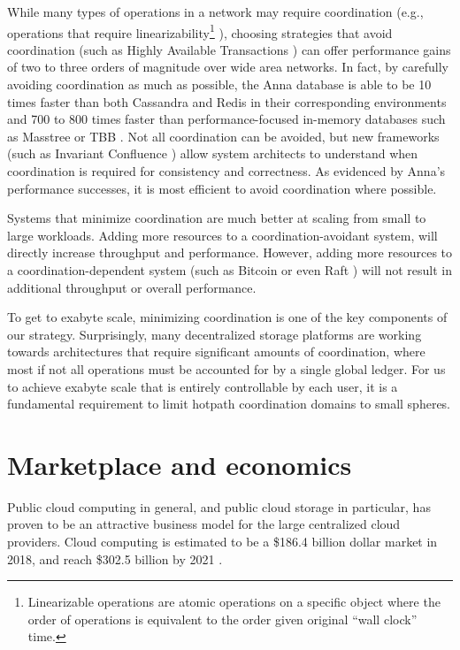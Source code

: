 \documentclass[11pt,fleqn,openany]{book}
\begin{document}
While many types of operations in a network may require coordination
(e.g., operations that require linearizability\footnote{
Linearizable operations are atomic operations on a specific object where
the order of operations is equivalent to the order given original ``wall clock''
time.
}
\cite{jepsen-consistency, hat, vv-consistency}), choosing strategies that
avoid coordination (such as Highly Available Transactions \cite{hat}) can offer
performance gains of two to three orders of magnitude over wide area networks.
In fact, by carefully avoiding coordination as much as possible, the Anna
database is able to be 10 times faster than both Cassandra and Redis in their
corresponding environments and 700 to 800 times faster than
performance-focused in-memory databases such as Masstree or TBB
\cite{anna, anna-announce}.
Not all coordination can be avoided, but new frameworks (such as Invariant
Confluence \cite{i-confluence}) allow system architects to understand when
coordination is required for consistency and correctness. As evidenced
by Anna's performance successes, it is most efficient to avoid coordination
where possible.

Systems that minimize coordination are
much better at scaling from small
to large workloads. Adding more resources to a coordination-avoidant system,
will directly increase throughput and performance. However,
adding more resources to a coordination-dependent system
(such as Bitcoin \cite{bitcoin} or even Raft \cite{raft}) will not result in
additional throughput or overall performance.

To get to exabyte scale, minimizing coordination is one of the key components
of our strategy.
Surprisingly, many decentralized storage platforms are working towards
architectures that require significant amounts of coordination,
where most if not all operations must be accounted for by a single global
ledger. For us to achieve exabyte scale that is entirely controllable by each user, it is a fundamental requirement to limit hotpath coordination domains to small spheres.

\section{Marketplace and economics}

Public cloud computing in general, and public cloud storage in particular, has
proven to be an attractive business model for the large centralized cloud
providers. Cloud computing is estimated to be a \$186.4 billion dollar market
in 2018, and reach \$302.5 billion by 2021 \cite{gartner-cloud-growth}.
\end{document}
